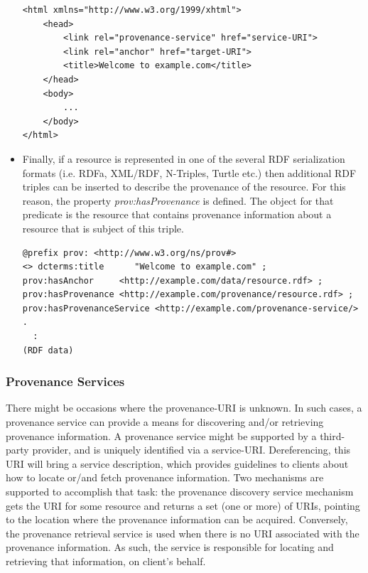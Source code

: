\begin{itemize}
\begin{verbatim}
<html xmlns="http://www.w3.org/1999/xhtml">
    <head>
        <link rel="provenance-service" href="service-URI">
        <link rel="anchor" href="target-URI">
        <title>Welcome to example.com</title>
    </head>
    <body>
        ...
    </body>
</html>
\end{verbatim}
  \item 
        Finally, if a resource is represented in one of the several RDF serialization formats (i.e. RDFa, XML/RDF, N-Triples, Turtle etc.) then additional RDF triples can be inserted to describe the provenance of the resource. For this reason, the property \emph{prov:hasProvenance} is defined. The object for that predicate is the resource that contains provenance information about a resource that is subject of this triple.
        
\begin{verbatim}
@prefix prov: <http://www.w3.org/ns/prov#>
<> dcterms:title      "Welcome to example.com" ;
prov:hasAnchor     <http://example.com/data/resource.rdf> ;
prov:hasProvenance <http://example.com/provenance/resource.rdf> ;
prov:hasProvenanceService <http://example.com/provenance-service/> .
  :
(RDF data)
\end{verbatim}

\end{itemize}

\subsubsection{Provenance Services}

There might be occasions where the provenance-URI is unknown. In such cases, a provenance service can provide a means for discovering and/or retrieving provenance information. A provenance service might be supported by a third-party provider, and is uniquely identified via a service-URI. Dereferencing, this URI will bring a service description, which provides guidelines to clients about how to locate or/and fetch provenance information. Two mechanisms are supported to accomplish that task: the provenance discovery service mechanism gets the URI for some resource and returns a set (one or more) of URIs, pointing to the location where the provenance information can be acquired. Conversely, the provenance retrieval service is used when there is no URI associated with the provenance information. As such, the service is responsible for locating and retrieving that information, on client's behalf.

